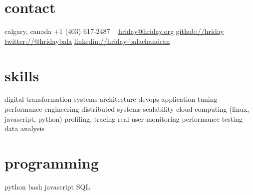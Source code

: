 \begin{aside}
    \section{contact}
        calgary, canada
        +1 (403) 617-2487
        ~
        \href{mailto:hriday@hriday.org}{hriday@hriday.org}
        \href{https://github.com/hriday}{github://hriday}
        \href{https://twitter.com/hridaybala}{twitter://@hridaybala}
        \href{https://www.linkedin.com/in/hriday-balachandran}{linkedin://hriday-balachandran}
    \section{skills}
        digital transformation
	systems architecture
        devops 
	application tuning
        performance engineering
        distributed systems
        scalability
        cloud computing
        (linux, javascript, python)
        profiling, tracing
        real-user monitoring
        performance testing
        data analysis
        \section{programming}
        python
        bash
	javascript
	SQL
\end{aside}
